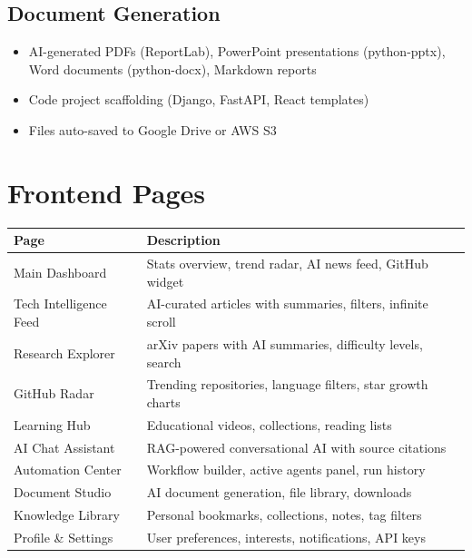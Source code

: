 \documentclass[12pt,a4paper]{report}
\begin{document}
\subsection{Document Generation}
\begin{itemize}
    \item AI-generated PDFs (ReportLab), PowerPoint presentations (python-pptx),
    Word documents (python-docx), Markdown reports
    \item Code project scaffolding (Django, FastAPI, React templates)
    \item Files auto-saved to Google Drive or AWS S3
\end{itemize}

\section{Frontend Pages}

\begin{center}
\begin{tabular}{lp{9cm}}
\toprule
\textbf{Page} & \textbf{Description} \\
\midrule
Main Dashboard       & Stats overview, trend radar, AI news feed, GitHub widget \\
Tech Intelligence Feed & AI-curated articles with summaries, filters, infinite scroll \\
Research Explorer    & arXiv papers with AI summaries, difficulty levels, search \\
GitHub Radar         & Trending repositories, language filters, star growth charts \\
Learning Hub         & Educational videos, collections, reading lists \\
AI Chat Assistant    & RAG-powered conversational AI with source citations \\
Automation Center    & Workflow builder, active agents panel, run history \\
Document Studio      & AI document generation, file library, downloads \\
Knowledge Library    & Personal bookmarks, collections, notes, tag filters \\
Profile \& Settings  & User preferences, interests, notifications, API keys \\
\bottomrule
\end{tabular}
\end{center}

\end{document}
